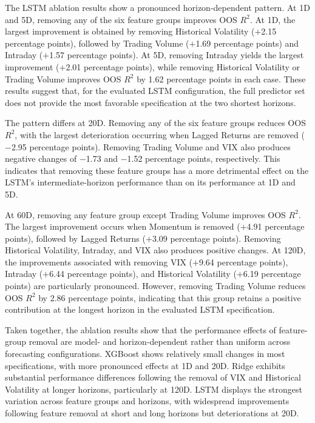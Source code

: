 \documentclass[runningheads,orivec]{llncs}
\begin{document}
The LSTM ablation results show a pronounced horizon-dependent pattern. At 1D and 5D, removing any of the six feature groups improves OOS $R^2$. At 1D, the largest improvement is obtained by removing Historical Volatility ($+$2.15 percentage points), followed by Trading Volume ($+$1.69 percentage points) and Intraday ($+$1.57 percentage points). At 5D, removing Intraday yields the largest improvement ($+$2.01 percentage points), while removing Historical Volatility or Trading Volume improves OOS $R^2$ by 1.62 percentage points in each case. These results suggest that, for the evaluated LSTM configuration, the full predictor set does not provide the most favorable specification at the two shortest horizons.

The pattern differs at 20D. Removing any of the six feature groups reduces OOS $R^2$, with the largest deterioration occurring when Lagged Returns are removed ($-$2.95 percentage points). Removing Trading Volume and VIX also produces negative changes of $-$1.73 and $-$1.52 percentage points, respectively. This indicates that removing these feature groups has a more detrimental effect on the LSTM's intermediate-horizon performance than on its performance at 1D and 5D.

At 60D, removing any feature group except Trading Volume improves OOS $R^2$. The largest improvement occurs when Momentum is removed ($+$4.91 percentage points), followed by Lagged Returns ($+$3.09 percentage points). Removing Historical Volatility, Intraday, and VIX also produces positive changes. At 120D, the improvements associated with removing VIX ($+$9.64 percentage points), Intraday ($+$6.44 percentage points), and Historical Volatility ($+$6.19 percentage points) are particularly pronounced. However, removing Trading Volume reduces OOS $R^2$ by 2.86 percentage points, indicating that this group retains a positive contribution at the longest horizon in the evaluated LSTM specification.

Taken together, the ablation results show that the performance effects of feature-group removal are model- and horizon-dependent rather than uniform across forecasting configurations. XGBoost shows relatively small changes in most specifications, with more pronounced effects at 1D and 20D. Ridge exhibits substantial performance differences following the removal of VIX and Historical Volatility at longer horizons, particularly at 120D. LSTM displays the strongest variation across feature groups and horizons, with widespread improvements following feature removal at short and long horizons but deteriorations at 20D.
\end{document}

